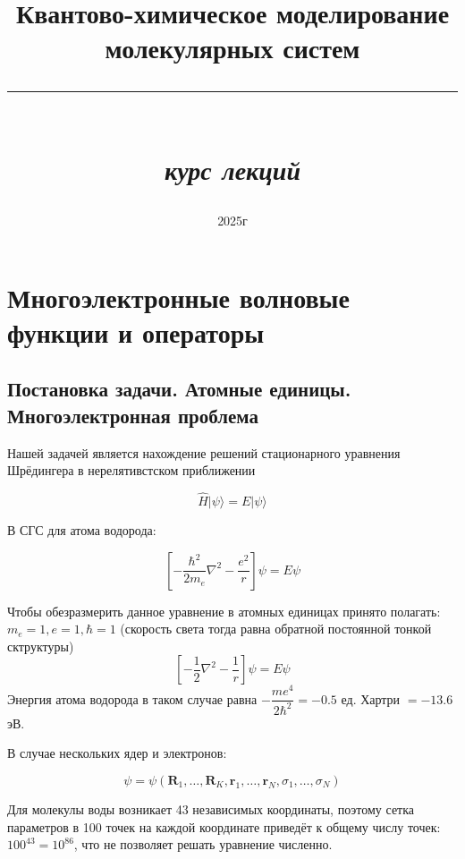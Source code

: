 \documentclass[12pt, oneside]{article}
\title{\huge Квантово-химическое моделирование молекулярных систем\\ \rule{0.8\textwidth}{0.4pt} \\ \large \textit{курс лекций}}
\date{2025г}
\numberwithin{equation}{section}  %
\begin{document}
\maketitle
\tableofcontents

\vspace{.25in}

\section{Многоэлектронные волновые функции и операторы}

\subsection{Постановка задачи. Атомные единицы. Многоэлектронная проблема}


\hspace{0.4cm} Нашей задачей является нахождение решений стационарного уравнения Шрёдингера в нерелятивстском приближении

\begin{equation}
    \hat{H} |\psi \rangle = E | \psi \rangle
    \label{eq:Shr}
\end{equation}

В СГС для атома водорода:

\begin{equation}
    \left[ - \dfrac{\hbar^2}{2 m_e} \nabla^2 - \dfrac{e^2}{r}\right] \psi = E \psi
\end{equation}


Чтобы обезразмерить данное уравнение в атомных единицах принято полагать: \(m_e = 1, e = 1, \hbar = 1\) (скорость света тогда равна обратной постоянной тонкой сктруктуры)
\begin{equation}
    \left[- \dfrac{1}{2} \nabla^2 - \dfrac{1}{r} \right] \psi = E \psi
\end{equation}
Энергия атома водорода в таком случае равна \(- \dfrac{m e^4}{2 \hbar^2} = - 0.5\) ед. Хартри \( = -13.6\) эВ.

В случае нескольких ядер и электронов:

\begin{equation}
    \psi = \psi(\bm{R}_1, \dots, \bm{R}_K, \bm{r}_1, \dots, \bm{r}_N, \sigma_1, \dots, \sigma_N)
\end{equation}


Для молекулы воды возникает 43 независимых координаты, поэтому сетка параметров в 100 точек на каждой координате приведёт к общему числу точек: \(100^{43} = 10^{86}\), что не позволяет решать уравнение численно.
\end{document}
